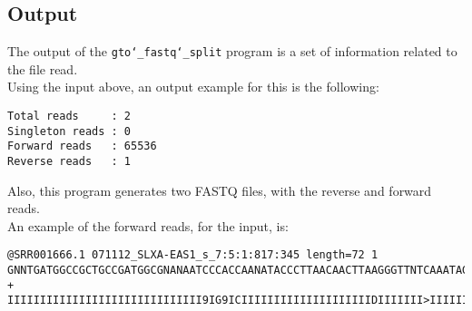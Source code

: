 \subsection*{Output}
The output of the \texttt{gto\char`_fastq\char`_split} program is a set of information related to the file read.\\
Using the input above, an output example for this is the following:
\begin{lstlisting}
Total reads     : 2
Singleton reads : 0
Forward reads   : 65536
Reverse reads   : 1
\end{lstlisting}
Also, this program generates two FASTQ files, with the reverse and forward reads.\\
An example of the forward reads, for the input, is: 
\begin{lstlisting}
@SRR001666.1 071112_SLXA-EAS1_s_7:5:1:817:345 length=72 1
GNNTGATGGCCGCTGCCGATGGCGNANAATCCCACCAANATACCCTTAACAACTTAAGGGTTNTCAAATAGA
+
IIIIIIIIIIIIIIIIIIIIIIIIIIIIII9IG9ICIIIIIIIIIIIIIIIIIIIIDIIIIIII>IIIIII/
\end{lstlisting}
